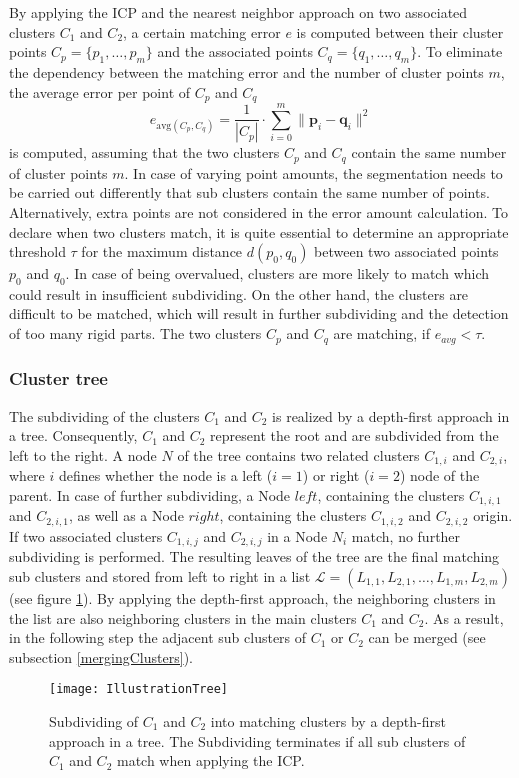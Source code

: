 By applying the ICP and the nearest neighbor approach on two associated clusters $C_1$ and $C_2$, a certain matching error $e$ is computed between their cluster points $ C_p =  \{ p_1, \ldots, p_m\}$ and the associated points $ C_q =  \{ q_1, \ldots, q_m\}$. To eliminate the dependency between the matching error and the number of cluster points $m$, the average error per point of $C_p$ and $C_q$
%
\begin{equation}
	e_{\mathrm{avg}(C_p, C_q)} = \frac{1}{| C_p |} \cdot \displaystyle\sum_{i=0}^{m}\| \boldsymbol{p}_i - \boldsymbol{q}_i\|^2
\end{equation}
%
is computed, assuming that the two clusters $C_p$ and $C_q$ contain the same number of cluster points $m$. In case of varying point amounts, the segmentation needs to be carried out differently that sub clusters contain the same number of points. Alternatively, extra points are not considered in the error amount calculation. To declare when two clusters match, it is quite essential to determine an appropriate threshold $\tau$ for the maximum distance $d(p_0, q_0)$ between two associated points $p_0$ and $q_0$. In case of being overvalued, clusters are more likely to match which could result in insufficient subdividing. On the other hand, the clusters are difficult to be matched, which will result in further subdividing and the detection of too many rigid parts. The two clusters $C_p$ and $C_q$ are matching, if $e_{avg} < \tau$.

\subsubsection{Cluster tree}
\label{tree}

The subdividing of the clusters $C_1$ and $C_2$ is realized by a depth-first approach in a tree. Consequently, $C_1$ and $C_2$ represent the root and are subdivided from the left to the right. A node $N$ of the tree contains two related clusters $C_{1,i}$ and $C_{2,i}$, where $i$ defines whether the node is a left ($i=1$) or right ($i=2$) node of the parent. In case of further subdividing, a Node $\mathit{left}$, containing the  clusters $C_{1,i,1}$ and $C_{2,i,1}$, as well as a Node $\mathit{right}$, containing the clusters $C_{1,i,2}$ and $C_{2,i,2}$ origin. If two associated clusters $C_{1,i,j}$ and $C_{2,i,j}$ in a Node $N_i$ match, no further subdividing is performed. The resulting leaves of the tree are the final matching sub clusters and stored from left to right in a list $\mathcal{L} = (L_{1,1},L_{2,1},\ldots,L_{1,m},L_{2,m})$ (see figure \ref{fig:illustrationTree}). By applying the depth-first approach, the neighboring clusters in the list are also neighboring clusters in the main clusters $C_1$ and $C_2$.  As a result, in the following step the adjacent sub clusters of $C_1$ or $C_2$ can be merged (see subsection \ref{mergingClusters}).
\begin{figure}
	\centering
	\texttt{[image: IllustrationTree]}
	\caption{Subdividing of $C_1$ and $C_2$ into matching clusters by a depth-first approach in a tree. The Subdividing terminates if all sub clusters of $C_1$ and $C_2$ match when applying the ICP.}
	\label{fig:illustrationTree}
\end{figure}

